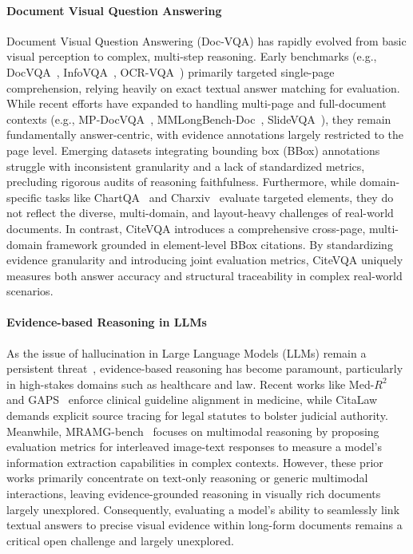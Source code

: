 \documentclass[]{opendatalab}
\begin{document}
\paragraph{Document Visual Question Answering}
Document Visual Question Answering (Doc-VQA) has rapidly evolved from basic visual perception to complex, multi-step reasoning. Early benchmarks (e.g., DocVQA~\citep{mathew2021docvqa}, InfoVQA~\citep{mathew2022infographicvqa}, OCR-VQA~\citep{mishra2019ocr}) primarily targeted single-page comprehension, relying heavily on exact textual answer matching for evaluation. While recent efforts have expanded to handling multi-page and full-document contexts (e.g., MP-DocVQA~\citep{tito2023hierarchical}, MMLongBench-Doc~\citep{ma2024mmlongbench}, SlideVQA~\citep{tanaka2023slidevqa}), they remain fundamentally answer-centric, with evidence annotations largely restricted to the page level. Emerging datasets integrating bounding box (BBox) annotations~\citep{loison2026vidore, yu2026sciegqadatasetscientificevidencegrounded} struggle with inconsistent granularity and a lack of standardized metrics, precluding rigorous audits of reasoning faithfulness. Furthermore, while domain-specific tasks like ChartQA~\citep{masry2022chartqa} and Charxiv~\citep{wang2024charxiv} evaluate targeted elements, they do not reflect the diverse, multi-domain, and layout-heavy challenges of real-world documents. In contrast, CiteVQA introduces a comprehensive cross-page, multi-domain framework grounded in element-level BBox citations. By standardizing evidence granularity and introducing joint evaluation metrics, CiteVQA uniquely measures both answer accuracy and structural traceability in complex real-world scenarios.

\paragraph{Evidence-based Reasoning in LLMs}
As the issue of hallucination in Large Language Models (LLMs) remain a persistent threat~\citep{wang2025rare, zhao2026retrieval, nakano2021webgpt, gao2023enabling, min2023factscore}, evidence-based reasoning has become paramount, particularly in high-stakes domains such as healthcare and law. Recent works like Med-$R^2$~\citep{lu2025med} and GAPS~\citep{chen2025gaps} enforce clinical guideline alignment in medicine, while CitaLaw~\citep{zhang2025citalaw} demands explicit source tracing for legal statutes to bolster judicial authority. Meanwhile, MRAMG-bench~\citep{yu2025mramg} focuses on multimodal reasoning by proposing evaluation metrics for interleaved image-text responses to measure a model's information extraction capabilities in complex contexts. However, these prior works primarily concentrate on text-only reasoning or generic multimodal interactions, leaving evidence-grounded reasoning in visually rich documents largely unexplored. Consequently, evaluating a model's ability to seamlessly link textual answers to precise visual evidence within long-form documents remains a critical open challenge and largely unexplored.
\end{document}
